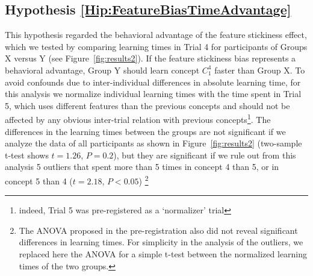 \subsection{Hypothesis \ref{Hip:FeatureBiasTimeAdvantage}}\label{Results:FeatureBiasTimeAdvantage} 
This hypothesis regarded the behavioral advantage of the feature stickiness effect, which we tested by comparing learning times in Trial 4 for participants of Groups X versus Y (see Figure~\ref{fig:results2}). If the feature stickiness bias represents a behavioral advantage, Group Y should learn concept $C^4_1$ faster than Group X. To avoid confounds due to inter-individual differences in absolute learning time, for this analysis we normalize individual learning times with the time spent in Trial 5, which uses different features than the previous concepts and should not be affected by any obvious inter-trial relation with previous concepts\footnote{indeed, Trial 5 was pre-registered as a `normalizer' trial}. The differences in the learning times between the groups are not significant if we analyze the data of all participants as shown in Figure~\ref{fig:results2} (two-sample t-test shows $t=1.26$,  $P=0.2$), but they are significant if we rule out from this analysis 5 outliers that spent more than 5 times in concept 4 than 5, or in concept 5 than 4 ($t=2.18$,  $P<0.05$) \footnote{The ANOVA proposed in the pre-registration also did not reveal significant differences in learning times. For simplicity in the analysis of the outliers, we replaced here the ANOVA for a simple t-test between the normalized learning times of the two groups.}


